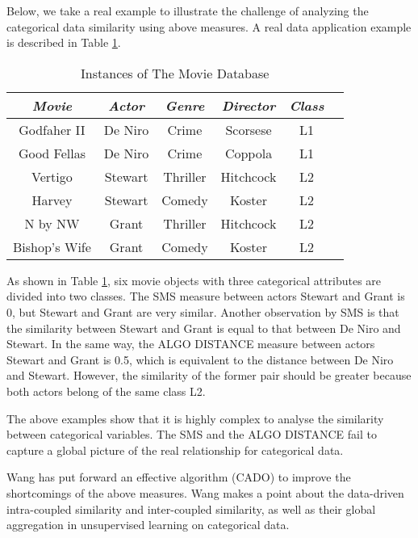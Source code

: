 \documentclass[review]{elsarticle}
\begin{document}
Below, we take a real example to illustrate the challenge of analyzing the categorical data similarity using above measures. A real data application example is described in Table \ref{tab:movie data}.
\begin{table}[!htp]\tabcolsep=0.065in
\centering
\caption{Instances of The Movie Database}
\small
\label{tab:movie data}
\begin{tabular}{cccccc}
\hline
\emph{Movie}&\emph{Actor}&\emph{Genre}&\emph{Director}&\emph{Class} \\
\hline
Godfaher II & De Niro & Crime & Scorsese & L1 \\

Good Fellas & De Niro & Crime & Coppola & L1 \\

Vertigo & Stewart & Thriller & Hitchcock & L2 \\

Harvey & Stewart & Comedy & Koster & L2 \\

N by NW & Grant & Thriller & Hitchcock & L2 \\

Bishop's Wife & Grant & Comedy & Koster & L2 \\
\hline
\end{tabular}
\end{table}
As shown in Table \ref{tab:movie data}, six movie objects with three categorical attributes are divided into two classes. The SMS measure between actors Stewart and Grant is 0, but Stewart and Grant are very similar. Another observation by SMS is that the similarity between Stewart and Grant is equal to that between De Niro and Stewart. In the same way, the ALGO DISTANCE measure between actors Stewart and Grant is 0.5, which is equivalent to the distance between De Niro and Stewart. However, the similarity of the former pair should be greater because both actors belong of the same class L2.

The above examples show that it is highly complex to analyse the similarity between categorical variables. The SMS and the ALGO DISTANCE fail to capture a global picture of the real relationship for categorical data.

Wang has put forward an effective algorithm \cite{Wang2015Coupled} (CADO) to improve the shortcomings of the above measures. Wang makes a point about the data-driven intra-coupled similarity and inter-coupled similarity, as well as their global aggregation in unsupervised learning on categorical data.
\end{document}
